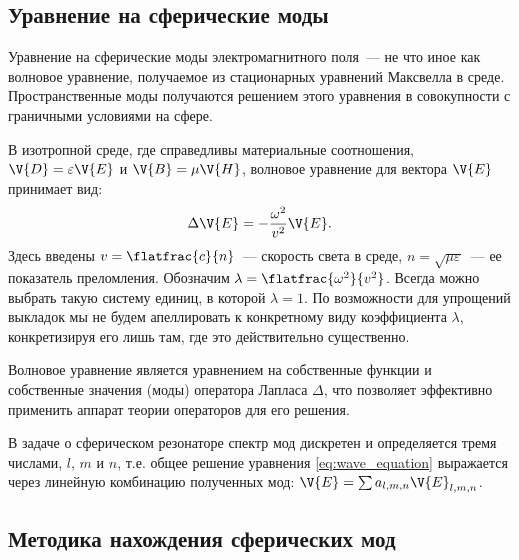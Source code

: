 %
%
%
%
%
%

\subsection{Уравнение на сферические моды}

    Уравнение на сферические моды электромагнитного поля~--- не что иное как волновое уравнение, получаемое из стационарных уравнений Максвелла в среде. Пространственные моды получаются решением этого уравнения в совокупности с граничными условиями на сфере.

    В изотропной среде, где справедливы материальные соотношения, $\V{D} = \varepsilon \V{E}$ и $\V{B} = \mu \V{H}$, волновое уравнение для вектора $\V{E}$ принимает вид:
    \begin{equation}\label{eq:wave_equation}
        \Delta \V{E} = - \frac{\omega^2}{v^2} \V{E} .
    \end{equation}
    Здесь введены $v = \flatfrac{c}{n}$~--- скорость света в среде, $n = \sqrt{\mu\varepsilon}$~--- ее показатель преломления. Обозначим $\lambda = \flatfrac{\omega^2}{v^2}$. Всегда можно выбрать такую систему единиц, в которой $\lambda = 1$. По возможности для упрощений выкладок мы не будем апеллировать к конкретному виду коэффициента $\lambda$, конкретизируя его лишь там, где это действительно существенно.

    Волновое уравнение является уравнением на собственные функции и собственные значения (моды) оператора Лапласа $\Delta$, что позволяет эффективно применить аппарат теории операторов для его решения.

    В задаче о сферическом резонаторе спектр мод дискретен и определяется тремя числами, $l$, $m$ и $n$, т.е. общее решение уравнения \autoref{eq:wave_equation} выражается через линейную комбинацию полученных мод: $\V{E} = \sum a_{l,m,n} \V{E}_{l,m,n}$.

%
%
%
%
%
%

\subsection{Методика нахождения сферических мод}

